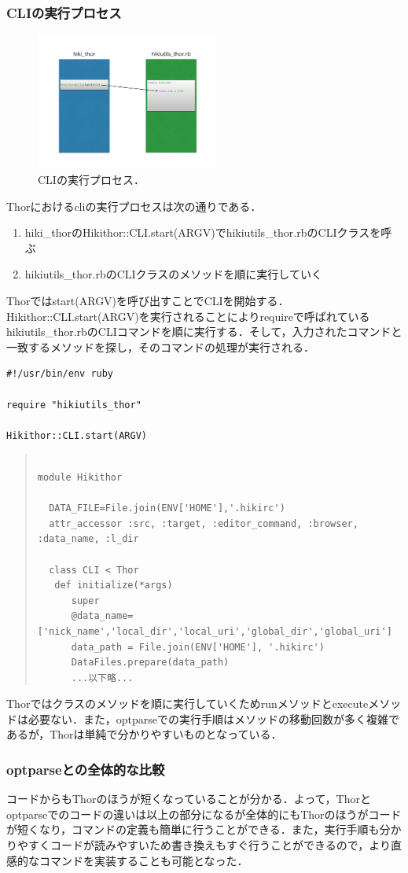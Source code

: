 \subsubsection{CLIの実行プロセス}
\begin{figure}[htbp]\begin{center}
\includegraphics[width=6cm,bb=0 0 442 432]{../figs/./hikiutils_yamane_09_copy.006.jpg}
\caption{CLIの実行プロセス．}
\label{default}\end{center}\end{figure}
Thorにおけるcliの実行プロセスは次の通りである．
\begin{enumerate}
\item hiki\_thorのHikithor::CLI.start(ARGV)でhikiutils\_thor.rbのCLIクラスを呼ぶ
\item hikiutils\_thor.rbのCLIクラスのメソッドを順に実行していく
\end{enumerate}
Thorではstart(ARGV)を呼び出すことでCLIを開始する．Hikithor::CLI.start(ARGV)を実行されることによりrequireで呼ばれているhikiutils\_thor.rbのCLIコマンドを順に実行する．そして，入力されたコマンドと一致するメソッドを探し，そのコマンドの処理が実行される．
\begin{lstlisting}[style=customRuby]
#!/usr/bin/env ruby                                                             

require "hikiutils_thor"

Hikithor::CLI.start(ARGV)
\end{lstlisting}\begin{quote}\begin{verbatim}

module Hikithor

  DATA_FILE=File.join(ENV['HOME'],'.hikirc')
  attr_accessor :src, :target, :editor_command, :browser, :data_name, :l_dir

  class CLI < Thor
   def initialize(*args)
      super
      @data_name=['nick_name','local_dir','local_uri','global_dir','global_uri']
      data_path = File.join(ENV['HOME'], '.hikirc')
      DataFiles.prepare(data_path)
      ...以下略...
\end{verbatim}\end{quote}
Thorではクラスのメソッドを順に実行していくためrunメソッドとexecuteメソッドは必要ない．また，optparseでの実行手順はメソッドの移動回数が多く複雑であるが，Thorは単純で分かりやすいものとなっている．

\subsubsection{optparseとの全体的な比較}
コードからもThorのほうが短くなっていることが分かる．よって，Thorとoptparseでのコードの違いは以上の部分になるが全体的にもThorのほうがコードが短くなり，コマンドの定義も簡単に行うことができる．また，実行手順も分かりやすくコードが読みやすいため書き換えもすぐ行うことができるので，より直感的なコマンドを実装することも可能となった．

